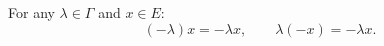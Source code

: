 For any $\lambda \in \Gamma$ and $x \in E$:
$$(-\lambda)x = -\lambda x, \qquad \lambda(-x) = -\lambda x.$$

